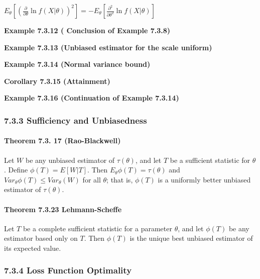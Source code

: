 \documentclass[6pt,twocolumn,Portrait]{article}
\let\oldparagraph\paragraph
\renewcommand{\paragraph}[1]{\oldparagraph{#1}\mbox{}}
\begin{document}
\(E_\theta\left[(\frac{\partial}{\partial\theta}\ln f(X|\theta))^2\right]=-E_\theta\left[\frac{\partial^2}{\partial\theta^2}\ln f(X|\theta)\right]\)

\textbf{Example 7.3.12 ( Conclusion of Example 7.3.8)}

\textbf{Example 7.3.13 (Unbiased estimator for the scale uniform)}

\textbf{Example 7.3.14 (Normal variance bound)}

\textbf{Corollary 7.3.15 (Attainment)}

\textbf{Example 7.3.16 (Continuation of Example 7.3.14)}

\hypertarget{sufficiency-and-unbiasedness}{%
\subsubsection{7.3.3 Sufficiency and
Unbiasedness}\label{sufficiency-and-unbiasedness}}

\hypertarget{Rao-Bla}{%
\paragraph{\texorpdfstring{\textbf{Theorem 7.3. 17
(Rao-Blackwell)}}{Theorem 7.3. 17 (Rao-Blackwell)}}\label{Rao-Bla}}

Let \(W\) be any unbiased estimator of \(\tau(\theta)\), and let \(T\)
be a sufficient statistic for \(\theta\). Define \(\phi(T)=E[W|T]\).
Then \(E_{\theta}\phi(T)=\tau(\theta)\) and
\(Var_{\theta}\phi(T)\le Var_{\theta}(W)\) for all \(\theta\); that is,
\(\phi(T)\) is a uniformly better unbiased estimator of
\(\tau(\theta)\).

\hypertarget{Lehm-Sche}{%
\paragraph{\texorpdfstring{\textbf{Theorem 7.3.23
Lehmann-Scheffe}}{Theorem 7.3.23 Lehmann-Scheffe}}\label{Lehm-Sche}}

Let \(T\) be a complete sufficient statistic for a parameter \(\theta\),
and let \(\phi(T)\) be any estimator based only on \(T\). Then
\(\phi(T)\) is the unique best unbiased estimator of its expected value.

\hypertarget{loss-function-optimality}{%
\subsubsection{7.3.4 Loss Function
Optimality}\label{loss-function-optimality}}
\end{document}
